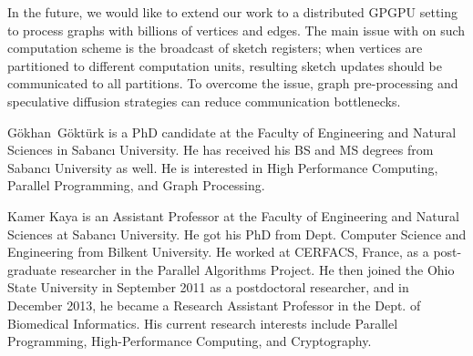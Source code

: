 \documentclass[10pt,journal,compsoc]{IEEEtran}
\newcommand\acro{{\sc{HyperFuseR\xspace}\xspace}\xspace}
\begin{document}
In the future, we would like to extend our work to a distributed GPGPU setting to process graphs with billions of vertices and edges. The main issue with \acro on such computation scheme is the broadcast of sketch registers; when vertices are partitioned to different computation units, resulting sketch updates should be communicated to all partitions. To overcome the issue, graph pre-processing and speculative diffusion strategies can reduce communication bottlenecks. 



\ifCLASSOPTIONcaptionsoff
  \newpage
\fi




\begin{IEEEbiography}{G\"{o}khan~G\"{o}kt\"{u}rk} is a PhD candidate at the Faculty of Engineering and Natural Sciences in Sabancı University. He has received his BS and MS degrees from Sabancı University as well. He is interested in High Performance Computing, Parallel Programming, and Graph Processing.
\end{IEEEbiography}
\begin{IEEEbiography}{Kamer Kaya} is an Assistant Professor at the Faculty of Engineering and Natural Sciences at Sabancı University. He got his PhD from Dept. Computer Science and Engineering from Bilkent University. He worked at CERFACS, France, as a post-graduate researcher in the Parallel Algorithms Project. He then joined the Ohio State University in September 2011 as a postdoctoral researcher, and in December 2013, he became a Research Assistant Professor in the Dept. of Biomedical Informatics.
His current research interests include Parallel Programming, High-Performance Computing, and Cryptography. 
    \end{IEEEbiography}
\end{document}

